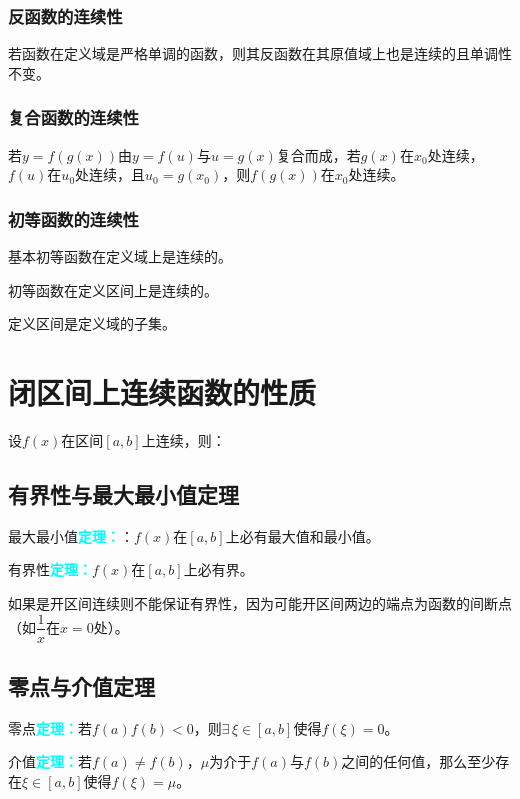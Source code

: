\documentclass[UTF8, 12pt]{ctexart}
\begin{document}
\subsubsection{反函数的连续性}

若函数在定义域是严格单调的函数，则其反函数在其原值域上也是连续的且单调性不变。

\subsubsection{复合函数的连续性}

若$y=f(g(x))$由$y=f(u)$与$u=g(x)$复合而成，若$g(x)$在$x_0$处连续，$f(u)$在$u_0$处连续，且$u_0=g(x_0)$，则$f(g(x))$在$x_0$处连续。

\subsubsection{初等函数的连续性}

基本初等函数在定义域上是连续的。

初等函数在定义区间上是连续的。

定义区间是定义域的子集。

\section{闭区间上连续函数的性质}

设$f(x)$在区间$[a,b]$上连续，则：

\subsection{有界性与最大最小值定理}

最大最小值\textcolor{aqua}{\textbf{定理：}}：$f(x)$在$[a,b]$上必有最大值和最小值。

有界性\textcolor{aqua}{\textbf{定理：}}$f(x)$在$[a,b]$上必有界。

如果是开区间连续则不能保证有界性，因为可能开区间两边的端点为函数的间断点（如$\dfrac{1}{x}$在$x=0$处）。

\subsection{零点与介值定理}

零点\textcolor{aqua}{\textbf{定理：}}若$f(a)f(b)<0$，则$\exists\,\xi\in[a,b]$使得$f(\xi)=0$。

介值\textcolor{aqua}{\textbf{定理：}}若$f(a)\neq f(b)$，$\mu$为介于$f(a)$与$f(b)$之间的任何值，那么至少存在$\xi\in[a,b]$使得$f(\xi)=\mu$。
\end{document}
